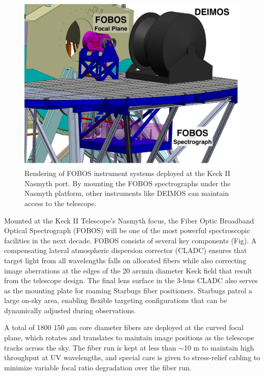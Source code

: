 \documentclass[oneside,11pt]{amsart}
\begin{document}
\begin{figure}[h!]
 \vskip -0.1in
 \includegraphics[width=\textwidth]{FOBOSatKeck_v1.pdf}
 \caption{\small Rendering of FOBOS instrument systems deployed at the Keck II Nasmyth port.  By mounting the FOBOS spectrographs under the Nasmyth platform, other instruments like DEIMOS can maintain access to the telescope.}\label{fig:layout}
\end{figure}

Mounted at the Keck II Telescope's Nasmyth focus, the Fiber Optic Broadband Optical Spectrograph (FOBOS) will be one of
the most powerful spectroscopic facilities in the next decade.  FOBOS consists of several key components (Fig).  A
compensating lateral atmospheric dispersion corrector (CLADC) ensures that target light from all wavelengths falls on
allocated fibers while also correcting image aberrations at the edges of the 20 arcmin diameter Keck field that result
from the telescope design.  The final lens surface in the 3-lens CLADC also serves as the mounting plate for roaming
Starbugs fiber positioners.  Starbugs patrol a large on-sky area, enabling flexible targeting configurations that can
be dynamically adjusted during observations.

A total of 1800 150 $\mu$m core diameter fibers are deployed at the curved focal plane, which rotates and translates to
maintain image positions as the telescope tracks across the sky.  The fiber run is kept at less than $\sim$10 m to
maintain high throughput at UV wavelengths, and special care is given to stress-relief cabling to minimize variable
focal ratio degradation over the fiber run.
\end{document}
